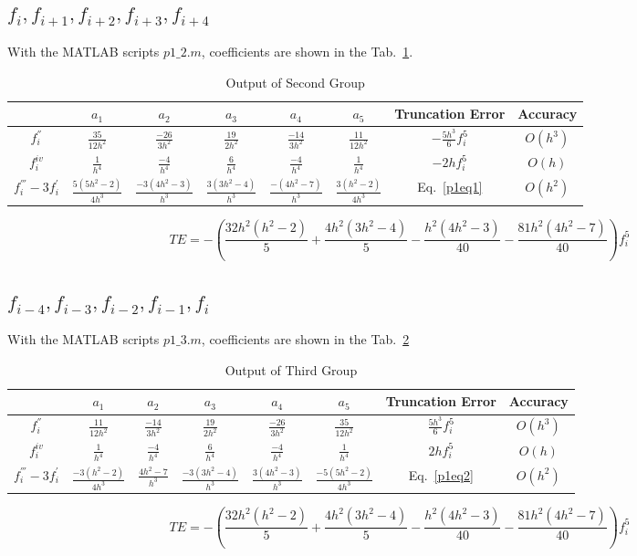 \documentclass[letterpaper,10pt]{article}
\begin{document}
\subsection{$f_{i},f_{i+1},f_{i+2},f_{i+3},f_{i+4}$}
With the MATLAB scripts $p1\_2.m$, coefficients are shown in the Tab.~\ref{tab1_2}.  
\begin{table}[htbp]
  \centering  
  \caption{Output of Second Group}\label{tab1_2}
  \begin{tabular}{cccccccc}
    \hline
    & $a_1$ & $a_2$ & $a_3$ & $a_4$& $a_5$ & Truncation Error& Accuracy\\
    \hline
    $f_{i}^{''}$ & $\frac{35}{12h^2}$ & $\frac{-26}{3h^2}$ & $\frac{19}{2h^2}$ & $\frac{-14}{3h^2}$ & $\frac{11}{12h^2}$ & $-\frac{5h^3}{6}f_{i}^{5}$& $O\left(h^3\right)$\\
    $f_{i}^{iv}$ & $\frac{1}{h^4}$ & $\frac{-4}{h^4}$ & $\frac{6}{h^4}$ & $\frac{-4}{h^4}$ & $\frac{1}{h^4}$ & $-2hf_{i}^{5}$& $O\left(h\right)$\\
    $f_{i}^{'''}-3f_{i}^{'}$ & $\frac{5\left(5h^2-2\right)}{4h^3}$ & $\frac{-3\left(4h^2-3\right)}{h^3}$ & $\frac{3\left(3h^2-4\right)}{h^3}$ & $\frac{-\left(4h^2-7\right)}{h^3}$ & $\frac{3\left(h^2-2\right)}{4h^3}$ & Eq.~\ref{p1eq1}&$O\left(h^2\right)$\\
    \hline
  \end{tabular}
\end{table}
\begin{equation}\label{p1eq1}
  TE = -\left(\frac{32h^2(h^2 - 2)}{5} + \frac{4h^2(3h^2 - 4)}{5} - \frac{h^2(4h^2 - 3)}{40} - \frac{81h^2(4h^2 - 7)}{40}\right)f_{i}^{5}
\end{equation}
\subsection{$f_{i-4},f_{i-3},f_{i-2},f_{i-1},f_{i}$}
With the MATLAB scripts $p1\_3.m$, coefficients are shown in the Tab.~\ref{tab1_3}
\begin{table}[htbp]
  \centering  
  \caption{Output of Third Group}\label{tab1_3}
  \begin{tabular}{cccccccc}
    \hline
    & $a_1$ & $a_2$ & $a_3$ & $a_4$& $a_5$ & Truncation Error& Accuracy\\
    \hline
    $f_{i}^{''}$ & $\frac{11}{12h^2}$ & $\frac{-14}{3h^2}$ & $\frac{19}{2h^2}$ & $\frac{-26}{3h^2}$ & $\frac{35}{12h^2}$ & $\frac{5h^3}{6}f_{i}^{5}$& $O\left(h^3\right)$\\
    $f_{i}^{iv}$ & $\frac{1}{h^4}$ & $\frac{-4}{h^4}$ & $\frac{6}{h^4}$ & $\frac{-4}{h^4}$ & $\frac{1}{h^4}$ & $2hf_{i}^{5}$& $O\left(h\right)$\\
    $f_{i}^{'''}-3f_{i}^{'}$ & $\frac{-3\left(h^2-2\right)}{4h^3}$ & $\frac{4h^2-7}{h^3}$ & $\frac{-3\left(3h^2-4\right)}{h^3}$ & $\frac{3\left(4h^2-3\right)}{h^3}$ & $\frac{-5\left(5h^2-2\right)}{4h^3}$ & Eq.~\ref{p1eq2}&$O\left(h^2\right)$\\
    \hline
  \end{tabular}
\end{table}
\begin{equation}\label{p1eq2}
  TE = -\left(\frac{32h^2(h^2 - 2)}{5} + \frac{4h^2(3h^2 - 4)}{5} - \frac{h^2(4h^2 - 3)}{40} - \frac{81h^2(4h^2 - 7)}{40}\right)f_{i}^{5}
\end{equation}
\end{document}
